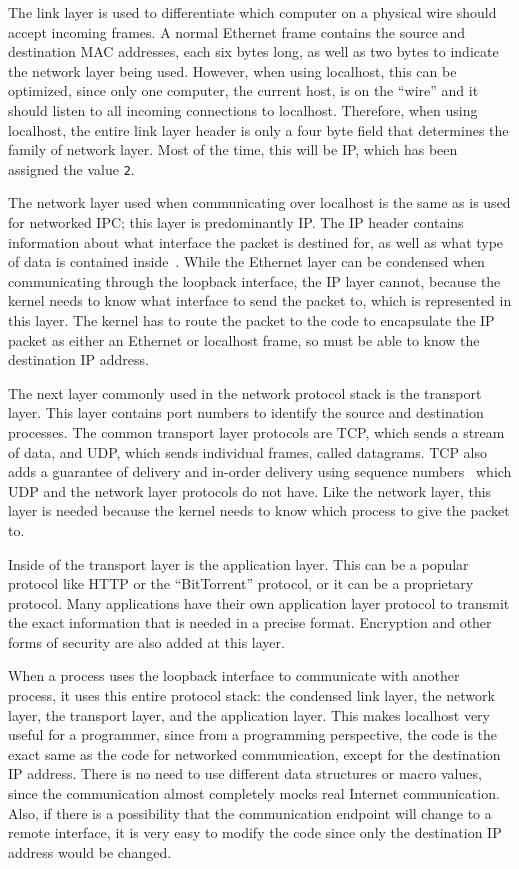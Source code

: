 The link layer is used to differentiate which computer on a physical wire should accept incoming frames.  A normal Ethernet frame contains the source and destination MAC addresses, each six bytes long, as well as two bytes to indicate the network layer being used.  However, when using localhost, this can be optimized, since only one computer, the current host, is on the ``wire'' and it should listen to all incoming connections to localhost.  Therefore, when using localhost, the entire link layer header is only a four byte field that determines the family of network layer.  Most of the time, this will be IP, which has been assigned the value \texttt{2}.

The network layer used when communicating over localhost is the same as is used for networked IPC; this layer is predominantly IP.  The IP header contains information about what interface the packet is destined for, as well as what type of data is contained inside~\cite{RFC0791}.  While the Ethernet layer can be condensed when communicating through the loopback interface, the IP layer cannot, because the kernel needs to know what interface to send the packet to, which is represented in this layer.  The kernel has to route the packet to the code to encapsulate the IP packet as either an Ethernet or localhost frame, so must be able to know the destination IP address.

The next layer commonly used in the network protocol stack is the transport layer.  This layer contains port numbers to identify the source and destination processes.  The common transport layer protocols are TCP, which sends a stream of data, and UDP, which sends individual frames, called datagrams.  TCP also adds a guarantee of delivery and in-order delivery using sequence numbers~\cite{RFC0793} which UDP and the network layer protocols do not have.  Like the network layer, this layer is needed because the kernel needs to know which process to give the packet to.

Inside of the transport layer is the application layer.  This can be a popular protocol like HTTP or the ``BitTorrent'' protocol, or it can be a proprietary protocol.  Many applications have their own application layer protocol to transmit the exact information that is needed in a precise format.  Encryption and other forms of security are also added at this layer.

When a process uses the loopback interface to communicate with another process, it uses this entire protocol stack: the condensed link layer, the network layer, the transport layer, and the application layer.  This makes localhost very useful for a programmer, since from a programming perspective, the code is the exact same as the code for networked communication, except for the destination IP address.  There is no need to use different data structures or macro values, since the communication almost completely mocks real Internet communication.  Also, if there is a possibility that the communication endpoint will change to a remote interface, it is very easy to modify the code since only the destination IP address would be changed.

